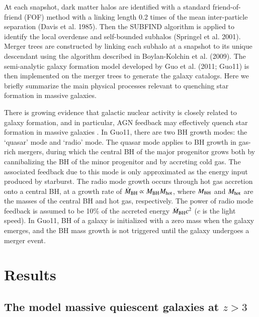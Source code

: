 \documentclass[useAMS,usenatbib]{mn2e}
\begin{document}
At each snapshot, dark matter halos are identified with a standard friend-of-friend (FOF) method with a linking length 0.2 times of the mean inter-particle separation (Davis et al. 1985). Then the SUBFIND algorithm is applied to identify the local overdense and self-bounded subhalos (Springel et al. 2001). Merger trees are constructed by linking each subhalo at a snapshot to its unique descendant using the algorithm described in Boylan-Kolchin et al. (2009). The semi-analytic galaxy formation model developed by Guo et al. (2011; Guo11) is then implemented on the merger trees to generate the galaxy catalogs. Here we briefly summarize the main physical processes relevant to quenching star formation in massive galaxies.

There is growing evidence that galactic nuclear activity is closely related to galaxy formation, and in particular, AGN feedback may effectively quench star formation in massive galaxies \citep[e.g.,][]{Smethurst16,Dubois13}. In Guo11, there are two BH growth modes: the `quasar' mode and `radio' mode. The quasar mode applies to BH growth in gas-rich mergers, during which the central BH of the major progenitor grows both by cannibalizing the BH of the minor progenitor and by accreting cold gas. The associated feedback due to this mode is only approximated as the energy input produced by starburst. The radio mode growth occurs through hot gas accretion onto a central BH, at a growth rate of $\dot{M}_{\rm{BH}}\propto M_{\rm{BH}}M_{\rm{hot}}$, where $M_{\rm{BH}}$ and $M_{\rm{hot}}$ are the masses of the central BH and hot gas, respectively. The power of radio mode feedback is assumed to be 10\% of the accreted energy $\dot{M}_{\rm{BH}}c^2$ ($c$ is the light speed). In Guo11, BH of a galaxy is initialized with a zero mass when the galaxy emerges, and the BH mass growth is not triggered until the galaxy undergoes a merger event.


\section{Results}
\subsection{The model massive quiescent galaxies at $z>3$}
\end{document}
